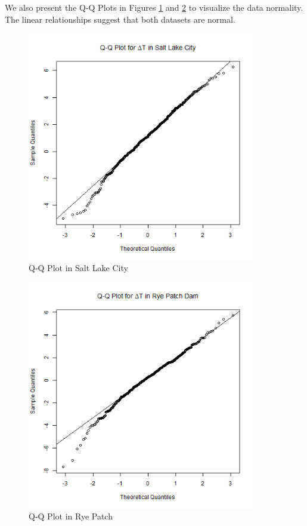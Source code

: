 We also present the Q-Q Plots in Figures \ref{fig:slc_diff_qqplot} and \ref{fig:rp_diff_qqplot} to visualize the data normality. The linear relationships suggest that both datasets are normal.

\begin{figure}
  \centering
  \includegraphics[width=10cm]{../data/img/Salt_Lake_Diff_QQ_Plot.PNG}
  \caption{Q-Q Plot in Salt Lake City}
  \label{fig:slc_diff_qqplot}
\end{figure}

\begin{figure}
  \centering
  \includegraphics[width=10cm]{../data/img/Rye_Patch_Diff_QQ_Plot.PNG}
  \caption{Q-Q Plot in Rye Patch}
  \label{fig:rp_diff_qqplot}
\end{figure}

